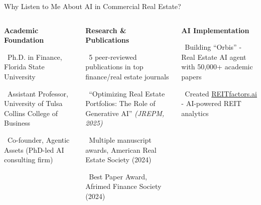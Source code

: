 \documentclass{beamer}
\begin{document}
\begin{frame}{Why Listen to Me About AI in Commercial Real Estate?}
  \begin{columns}[T]
    \begin{column}{0.32\textwidth}
      \textbf{\color{RoyalBlue} \small Academic Foundation}
      \vspace{0.2cm}
      
      \footnotesize
      \textbullet~Ph.D. in Finance, Florida State University
      
      \vspace{3pt}
      \textbullet~Assistant Professor, University of Tulsa Collins College of Business
      
      \vspace{3pt}
      \textbullet~Co-founder, Agentic Assets (PhD-led AI consulting firm)
    \end{column}
    
    \begin{column}{0.39\textwidth}
      \textbf{\color{RoyalBlue} \small  Research \& Publications}
      \vspace{0.2cm}
      
      \footnotesize
      \textbullet~5 peer-reviewed publications in top finance/real estate journals
      
      \vspace{3pt}
      \textbullet~``Optimizing Real Estate Portfolios: The Role of Generative AI'' \textit{(JREPM, 2025)}
      
      \vspace{3pt}
      \textbullet~Multiple manuscript awards, American Real Estate Society (2024)
      
      \vspace{3pt}
      \textbullet~Best Paper Award, Afrimed Finance Society (2024)
    \end{column}
    
    \begin{column}{0.34\textwidth}
      \textbf{\color{RoyalBlue} \small  AI Implementation}
      \vspace{0.2cm}
      
      \footnotesize
      \textbullet~Building ``Orbis'' - Real Estate AI agent with 50,000+ academic papers
      
      \vspace{3pt}
      \textbullet~Created \href{https://www.reitfactors.ai/}{\color{blue!60!black}REITfactors.ai} - AI-powered REIT analytics
      

\end{column}
\end{columns}
\end{frame}
\end{document}
